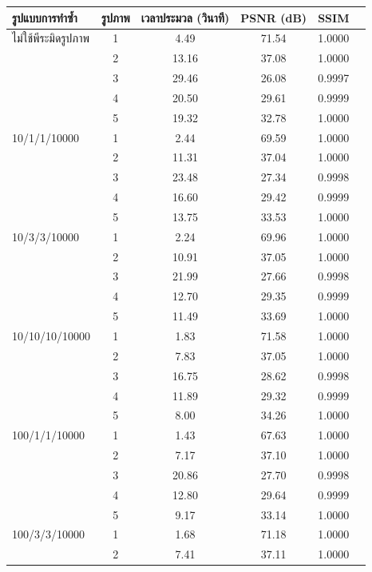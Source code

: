 \begin{table}[H]
    \footnotesize
    \centering
    \begin{tabular}[ht]{|l|c|c|c|c|c|}
        \hline
        รูปแบบการทำซ้ำ  & รูปภาพ &เวลาประมวล  (วินาที) & PSNR (dB) & SSIM \\
        \hline
        ไม่ใช้พีระมิดรูปภาพ & 1 & 4.49  & 71.54 & 1.0000 \\ 
        & 2 & 13.16 & 37.08 & 1.0000 \\
        & 3 & 29.46 & 26.08 & 0.9997 \\
        & 4 & 20.50 & 29.61 & 0.9999 \\
        & 5 & 19.32 & 32.78 & 1.0000 \\
        \hline
        10/1/1/10000 & 1 & 2.44 & 69.59& 1.0000 \\
        & 2 & 11.31 &37.04 & 1.0000 \\
        & 3 & 23.48 & 27.34 & 0.9998 \\
        & 4 & 16.60 & 29.42 & 0.9999 \\
        & 5 & 13.75 & 33.53 & 1.0000 \\
        \hline
        10/3/3/10000  & 1 & 2.24 & 69.96 & 1.0000\\
        & 2 & 10.91 & 37.05 & 1.0000 \\
        & 3 & 21.99 & 27.66 & 0.9998 \\
        & 4 & 12.70 & 29.35 & 0.9999 \\
        & 5 & 11.49 & 33.69 & 1.0000\\
        \hline
        10/10/10/10000  & 1 & 1.83 & 71.58 & 1.0000 \\
        & 2 & 7.83 & 37.05 & 1.0000 \\
        & 3 & 16.75 & 28.62 & 0.9998 \\
        & 4 & 11.89 & 29.32 & 0.9999 \\
        & 5 & 8.00 & 34.26 & 1.0000 \\
        \hline
        100/1/1/10000  & 1 & 1.43 & 67.63 & 1.0000\\
        & 2 & 7.17 & 37.10 & 1.0000 \\
        & 3 & 20.86 & 27.70 & 0.9998 \\
        & 4 & 12.80 & 29.64 & 0.9999\\
        & 5 & 9.17 & 33.14 & 1.0000 \\
        \hline
        100/3/3/10000  & 1 & 1.68 & 71.18 & 1.0000 \\
        & 2 & 7.41 & 37.11 & 1.0000\\

\end{tabular}
\end{table}
